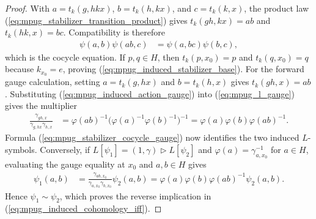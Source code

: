 \begin{proof}\leanok
    With
    $a=t_k(g,hkx)$, $b=t_k(h,kx)$, and $c=t_k(k,x)$,
    the product law (\ref{eq:mpug_stabilizer_transition_product}) gives
    $t_k(gh,kx)=ab$ and $t_k(hk,x)=bc$. Compatibility is therefore
    \begin{align}
        \psi(a,b)\psi(ab,c)
         & =\psi(a,bc)\psi(b,c),
    \end{align}
    which is the cocycle equation. If $p,q\in H$, then
    $t_k(p,x_0)=p$ and $t_k(q,x_0)=q$ because $k_{x_0}=e$, proving
    (\ref{eq:mpug_induced_stabilizer_base}). For the forward gauge
    calculation, setting $a=t_k(g,hx)$ and $b=t_k(h,x)$ gives
    $t_k(gh,x)=ab$. Substituting (\ref{eq:mpug_induced_action_gauge}) into
    (\ref{eq:mpug_l_gauge}) gives the multiplier
    \begin{align}
        \frac{\gamma_{gh,x}}{\gamma_{g,hx}\gamma_{h,x}}
         & =\varphi(ab)^{-1}
        \bigl(\varphi(a)^{-1}\varphi(b)^{-1}\bigr)^{-1}
        =\varphi(a)\varphi(b)\varphi(ab)^{-1}.
    \end{align}
    Formula (\ref{eq:mpug_stabilizer_cocycle_gauge}) now identifies the two
    induced $L$-symbols. Conversely, if
    $L[\psi_1]=(1,\gamma)\mathbin{\triangleright}L[\psi_2]$ and
    $\varphi(a)=\gamma_{a,x_0}^{-1}$ for $a\in H$, evaluating the gauge
    equality at $x_0$ and $a,b\in H$ gives
    \begin{align}
        \psi_1(a,b)
         & =\frac{\gamma_{ab,x_0}}
            {\gamma_{a,x_0}\gamma_{b,x_0}}\psi_2(a,b)
        =\varphi(a)\varphi(b)\varphi(ab)^{-1}\psi_2(a,b).
    \end{align}
    Hence $\psi_1\sim\psi_2$, which proves the reverse implication in
    (\ref{eq:mpug_induced_cohomology_iff}).
\end{proof}

